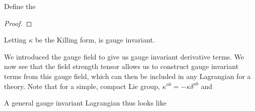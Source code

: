 \documentclass{article}
\begin{document}
\begin{definition}
Define the  
\end{definition}

\begin{prop}
\end{prop}
\begin{proof}
\end{proof}

\begin{corollary}
Letting $\kappa$ be the Killing form, 
is gauge invariant. 
\end{corollary}

\begin{idea}
We introduced the gauge field to give us gauge invariant derivative terms. We now see that the field strength tensor allows us to construct gauge invariant terms from this gauge field, which can then be included in any Lagrangian for a theory. Note that for a simple, compact Lie group, $\kappa^{ab} = - \kappa \delta^{ab}$ and 
\end{idea}

A general gauge invariant Lagrangian thus looks like 
\end{document}
